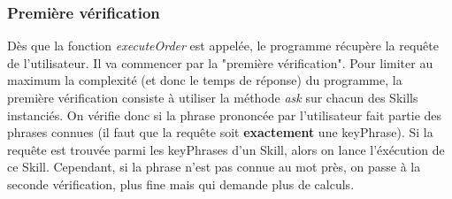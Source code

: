 \documentclass{report}
\begin{document}
      \subsubsection{Première vérification}
      {Dès que la fonction \textit{executeOrder} est appelée, le programme récupère la
       requête de l'utilisateur. Il va commencer par la "première vérification".
       Pour limiter au maximum la complexité (et donc le temps de réponse) du programme,
        la première vérification consiste à utiliser la méthode \textit{ask} sur
         chacun des Skills instanciés. On vérifie donc si la phrase prononcée
         par l'utilisateur fait partie des phrases connues (il faut que la requête
         soit \textbf{exactement} une keyPhrase).\newline}
      {Si la requête est trouvée parmi les keyPhrases d'un Skill,
      alors on lance l'éxécution de ce Skill. Cependant, si la phrase n'est
      pas connue au mot près, on passe à la seconde vérification, plus fine mais
      qui demande plus de calculs.}
\end{document}

